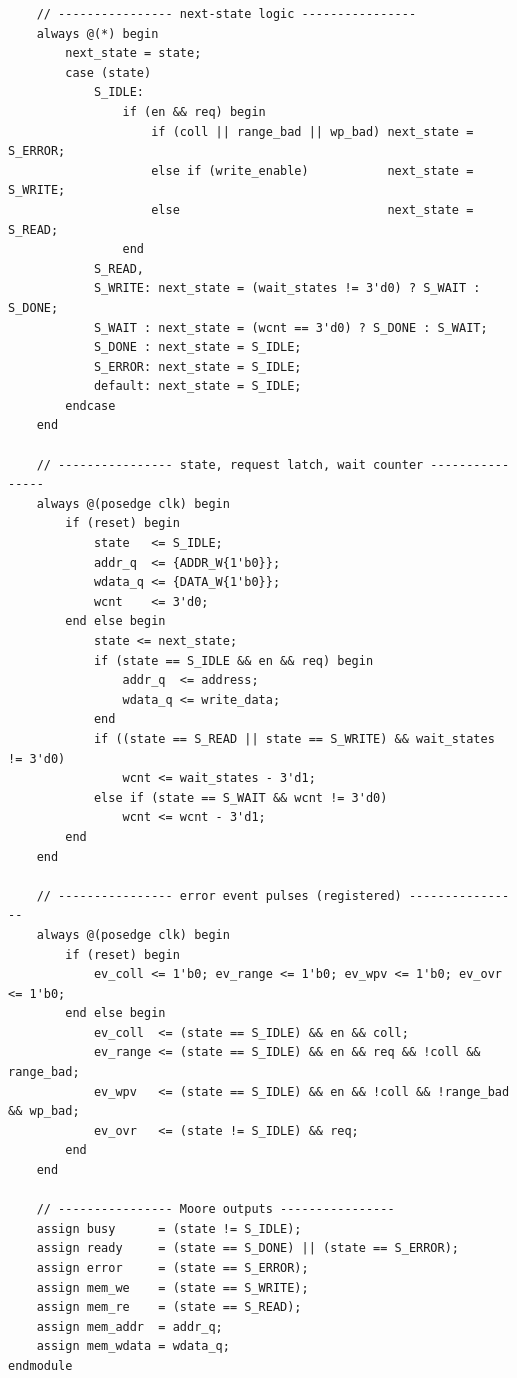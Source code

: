 \documentclass[11pt,a4paper]{article}
\begin{document}
\begin{lstlisting}
    // ---------------- next-state logic ----------------
    always @(*) begin
        next_state = state;
        case (state)
            S_IDLE:
                if (en && req) begin
                    if (coll || range_bad || wp_bad) next_state = S_ERROR;
                    else if (write_enable)           next_state = S_WRITE;
                    else                             next_state = S_READ;
                end
            S_READ,
            S_WRITE: next_state = (wait_states != 3'd0) ? S_WAIT : S_DONE;
            S_WAIT : next_state = (wcnt == 3'd0) ? S_DONE : S_WAIT;
            S_DONE : next_state = S_IDLE;
            S_ERROR: next_state = S_IDLE;
            default: next_state = S_IDLE;
        endcase
    end

    // ---------------- state, request latch, wait counter ----------------
    always @(posedge clk) begin
        if (reset) begin
            state   <= S_IDLE;
            addr_q  <= {ADDR_W{1'b0}};
            wdata_q <= {DATA_W{1'b0}};
            wcnt    <= 3'd0;
        end else begin
            state <= next_state;
            if (state == S_IDLE && en && req) begin
                addr_q  <= address;
                wdata_q <= write_data;
            end
            if ((state == S_READ || state == S_WRITE) && wait_states != 3'd0)
                wcnt <= wait_states - 3'd1;
            else if (state == S_WAIT && wcnt != 3'd0)
                wcnt <= wcnt - 3'd1;
        end
    end

    // ---------------- error event pulses (registered) ----------------
    always @(posedge clk) begin
        if (reset) begin
            ev_coll <= 1'b0; ev_range <= 1'b0; ev_wpv <= 1'b0; ev_ovr <= 1'b0;
        end else begin
            ev_coll  <= (state == S_IDLE) && en && coll;
            ev_range <= (state == S_IDLE) && en && req && !coll && range_bad;
            ev_wpv   <= (state == S_IDLE) && en && !coll && !range_bad && wp_bad;
            ev_ovr   <= (state != S_IDLE) && req;
        end
    end

    // ---------------- Moore outputs ----------------
    assign busy      = (state != S_IDLE);
    assign ready     = (state == S_DONE) || (state == S_ERROR);
    assign error     = (state == S_ERROR);
    assign mem_we    = (state == S_WRITE);
    assign mem_re    = (state == S_READ);
    assign mem_addr  = addr_q;
    assign mem_wdata = wdata_q;
endmodule
\end{lstlisting}
\end{document}
